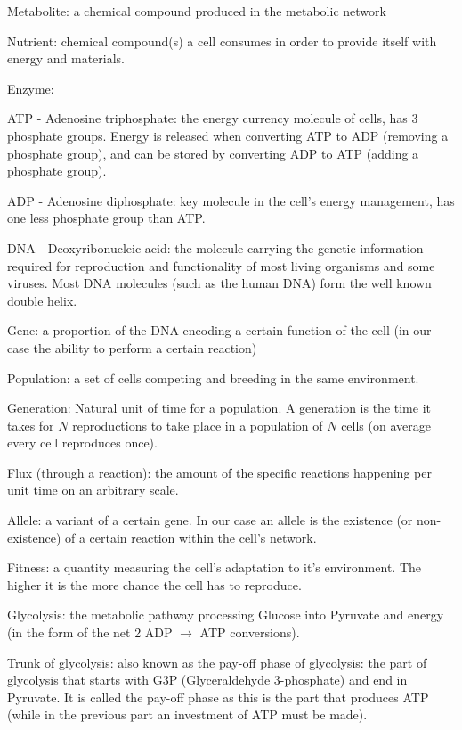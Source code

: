 \documentclass[10pt,a4paper]{article}
\begin{document}
	\begin{framed}
		
	Metabolite: a chemical compound produced in the metabolic network

	Nutrient: chemical compound(s) a cell consumes in order to provide itself with energy and materials.

	Enzyme:

	ATP - Adenosine triphosphate: the energy currency molecule of cells, has 3 phosphate groups. Energy is released when converting ATP to ADP (removing a phosphate group), and can be stored by converting ADP to ATP (adding a phosphate group).

	ADP - Adenosine diphosphate: key molecule in the cell's energy management, has one less phosphate group than ATP.

	DNA - Deoxyribonucleic acid: the molecule carrying the genetic information required for reproduction and functionality of most living organisms and some viruses. Most DNA molecules (such as the human DNA) form the well known double helix. 

	Gene: a proportion of the DNA encoding a certain function of the cell (in our case the ability to perform a certain reaction)

	Population: a set of cells competing and breeding in the same environment.

	Generation: Natural unit of time for a population. A generation is the time it takes for $N$ reproductions to take place in a population of $N$ cells (on average every cell reproduces once).

	Flux (through a reaction): the amount of the specific reactions happening per unit time on an arbitrary scale. 

	Allele: a variant of a certain gene. In our case an allele is the existence (or non-existence) of a certain reaction within the cell's network.

	Fitness: a quantity measuring the cell's adaptation to it's environment. The higher it is the more chance the cell has to reproduce.

	Glycolysis: the metabolic pathway processing Glucose into Pyruvate and energy (in the form of the net 2 ADP $\rightarrow$ ATP conversions).

	Trunk of glycolysis: also known as the pay-off phase of glycolysis: the part of glycolysis that starts with G3P (Glyceraldehyde 3-phosphate) and end in Pyruvate. It is called the pay-off phase as this is the part that produces ATP (while in the previous part an investment of ATP must be made).

	\end{framed}
\end{document}
